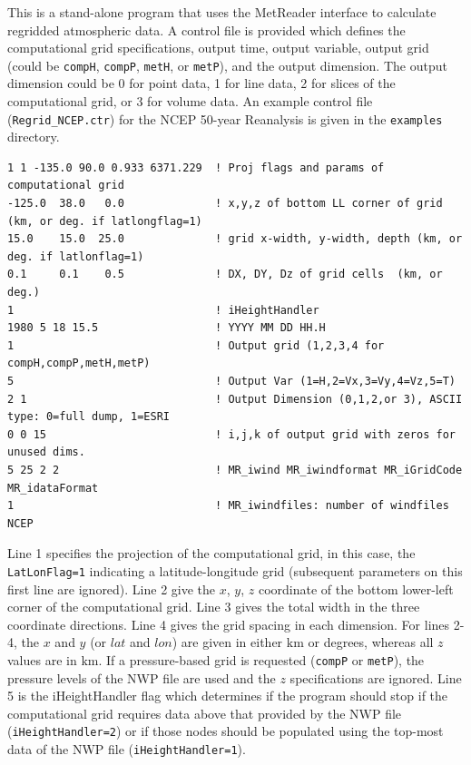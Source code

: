 \documentclass[11pt]{article}   %
\begin{document}
This is a stand-alone program that uses the MetReader interface to calculate
regridded atmospheric data.  A control file is provided which defines the
computational grid specifications, output time, output variable, output
grid (could be \texttt{compH}, \texttt{compP}, \texttt{metH}, or \texttt{metP}), and the output dimension.
The output dimension could be 0 for point data, 1 for line data,
2 for slices of the computational grid, or 3
for volume data.  An example control file (\texttt{Regrid\_NCEP.ctr}) for
the NCEP 50-year Reanalysis is given  in the \texttt{examples} directory.
\footnotesize
\begin{verbatim}
1 1 -135.0 90.0 0.933 6371.229  ! Proj flags and params of computational grid
-125.0  38.0   0.0              ! x,y,z of bottom LL corner of grid (km, or deg. if latlongflag=1)
15.0    15.0  25.0              ! grid x-width, y-width, depth (km, or deg. if latlonflag=1)
0.1     0.1    0.5              ! DX, DY, Dz of grid cells  (km, or deg.)
1                               ! iHeightHandler
1980 5 18 15.5                  ! YYYY MM DD HH.H
1                               ! Output grid (1,2,3,4 for compH,compP,metH,metP)
5                               ! Output Var (1=H,2=Vx,3=Vy,4=Vz,5=T)
2 1                             ! Output Dimension (0,1,2,or 3), ASCII type: 0=full dump, 1=ESRI
0 0 15                          ! i,j,k of output grid with zeros for unused dims.
5 25 2 2                        ! MR_iwind MR_iwindformat MR_iGridCode MR_idataFormat
1                               ! MR_iwindfiles: number of windfiles
NCEP
\end{verbatim}
\normalsize
Line 1 specifies the projection of the computational grid, in this case, the
\texttt{LatLonFlag=1} indicating
a latitude-longitude grid (subsequent parameters on this first line are ignored).
Line 2 give the $x$, $y$, $z$ coordinate of the bottom lower-left corner of the computational
grid.
Line 3 gives the total width in the three coordinate directions.  
Line 4 gives the grid spacing in each dimension.  For lines 2-4, the $x$ and $y$ (or $lat$ and $lon$)
are given in either $\mathrm{km}$ or degrees, whereas all $z$ values are in $\mathrm{km}$.  If a
pressure-based grid is requested (\texttt{compP} or \texttt{metP}), the pressure levels of the NWP file are used
and the $z$ specifications are ignored.
Line 5 is the iHeightHandler flag which determines if the program should stop if the computational
grid requires data above that provided by the NWP file (\texttt{iHeightHandler=2}) or if those nodes
should be populated using the top-most data of the NWP file (\texttt{iHeightHandler=1}).
\end{document}
